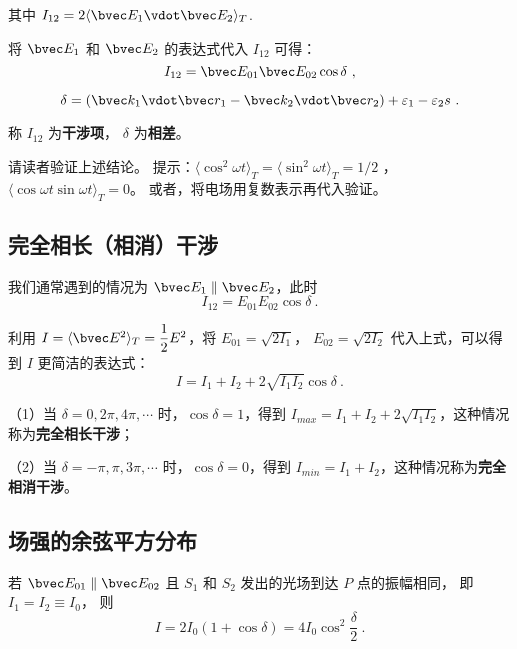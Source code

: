 其中 $ I _{12} =2 \langle \bvec E_1 \vdot \bvec E_2 \rangle _T$.

将 $\bvec E_1$ 和 $ \bvec E_2$ 的表达式代入 $I_{12}$ 可得：
\begin{equation}
I_{12} = \bvec E_{01}\bvec E_{02} \cos\delta~,
\end{equation}

\begin{equation}
\delta = (\bvec k_1 \vdot \bvec r_1 - \bvec k_2 \vdot \bvec r_2 ) + \varepsilon_1 - \varepsilon_2 s~.
\end{equation}

称 $ I_{12} $ 为\textbf{干涉项}， $ \delta $ 为\textbf{相差}。
\begin{exercise}{}
请读者验证上述结论。 提示：$\langle \cos ^2 \omega t \rangle _T = \langle \sin ^2 \omega t \rangle _T = 1/2 $ ， $ \langle \cos \omega t \sin \omega t \rangle_T =0 $。 或者，将电场用复数表示再代入验证。
\end{exercise}

\subsection{完全相长（相消）干涉}
我们通常遇到的情况为 $\bvec E_1 \parallel \bvec E_2$，此时
\begin{equation}
 I_{12} = E_{01} E_{02}\cos\delta~.
\end{equation}

利用 $ I = \langle \bvec E^2 \rangle _T = \dfrac{1}{2}E^2$，将 $ E_{ 01} = \sqrt{2I_1}$， $ E_{ 02} = \sqrt{2I_2}$  代入上式，可以得到 $ I $ 更简洁的表达式：
\begin{equation}
 I = I_1 + I_2 + 2\sqrt{I_1 I_2}\cos\delta~.
\end{equation}

（1）当 $\delta = 0, 2\pi, 4\pi, \cdots$ 时，$\cos \delta = 1$，得到 $ I_{max} = I_1 + I_2 +2\sqrt{I_1 I_2}$，这种情况称为\textbf{完全相长干涉}；

（2）当 $\delta = -\pi, \pi, 3\pi, \cdots$ 时，$\cos \delta = 0$，得到 $ I_{min} = I_1 + I_2 $，这种情况称为\textbf{完全相消干涉}。

\subsection{场强的余弦平方分布}

若 $ \bvec E_{01} \parallel \bvec E_{02} $ 且 $S_1$ 和 $S_2$ 发出的光场到达 $ P $ 点的振幅相同， 即 $ I_1 = I_2 \equiv I_0 $， 则
\begin{equation}
 I = 2 I_0 ( 1 + \cos\delta ) = 4 I_0 \cos ^2\dfrac { \delta } { 2 } ~.
\end{equation}

